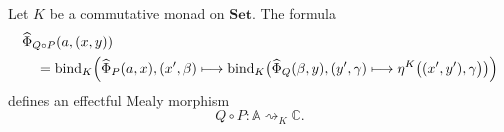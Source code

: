\begin{proposition}
\label{prop:effectful-pipeline-composition-set}
    Let \(K\) be a commutative monad on \(\mathbf{Set}\). The formula
    \begin{equation}
    \begin{aligned}
        &
        \widehat\Phi_{Q\circ P}(a,(x,y))
        \\
        &\quad=
        \operatorname{bind}_{K}
        \Bigl(
            \widehat\Phi_P(a,x),
            (x',\beta)
            \longmapsto
            \operatorname{bind}_{K}
            \bigl(
                \widehat\Phi_Q(\beta,y),
                (y',\gamma)
                \longmapsto
                \eta^K
                \bigl(
                    (x',y'),
                    \gamma
                \bigr)
            \bigr)
        \Bigr)
    \end{aligned}
    \label{eq:effectful-pipeline-composition}
    \end{equation}
    defines an effectful Mealy morphism
    \[
        Q\circ P:
        \mathbb A\rightsquigarrow_K\mathbb C.
    \]
\end{proposition}
